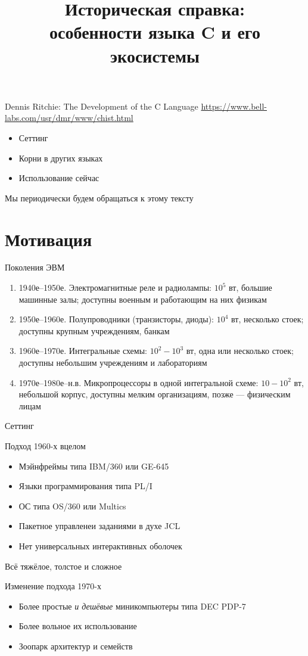 \documentclass[xetex,aspectratio=169]{beamer}
\title[История C]{Историческая справка:\\особенности языка C и его экосистемы}
\begin{document}
\titleslide

\tocslide

\begin{frame}{Dennis Ritchie: The Development of the C Language}
	\url{https://www.bell-labs.com/usr/dmr/www/chist.html}
	\begin{itemize}
		\item Сеттинг
		\item Корни в других языках
		\item Использование сейчас
	\end{itemize}
	Мы периодически будем обращаться к этому тексту
\end{frame}

\section{Мотивация}

\begin{frame}{Поколения ЭВМ}
	\begin{enumerate}
		\item 1940е--1950е. Электромагнитные реле и радиолампы: $10^5$ вт, большие машинные залы; доступны военным и работающим на них физикам
		\item 1950е--1960е. Полупроводники (транзисторы, диоды): $10^4$ вт, несколько стоек; доступны крупным учреждениям, банкам
		\item 1960е--1970е. Интегральные схемы: $10^2-10^3$ вт, одна или несколько стоек; доступны небольшим учреждениям и лабораториям
		\item 1970е--1980е--н.в. Микропроцессоры в одной интегральной схеме: $10-10^2$ вт, небольшой корпус, доступны мелким организациям, позже --- физическим лицам
	\end{enumerate}
\end{frame}

\begin{frame}{Сеттинг}
	\begin{block}{Подход 1960-х вцелом}
		\begin{itemize}
			\item Мэйнфреймы типа IBM/360 или GE-645
			\item Языки программирования типа PL/I
			\item ОС типа OS/360 или Multics
			\item Пакетное управленеи заданиями в духе JCL
			\item Нет универсальных интерактивных оболочек
		\end{itemize}
		Всё тяжёлое, толстое и сложное
	\end{block}
\pause
	\begin{block}{Изменение подхода 1970-х}
	\begin{itemize}
		\item Более простые \emph{и дешёвые} миникомпьютеры типа DEC PDP-7
		\item Более вольное их использование
		\item Зоопарк архитектур и семейств
	\end{itemize}
\end{block}
\end{frame}
\end{document}
